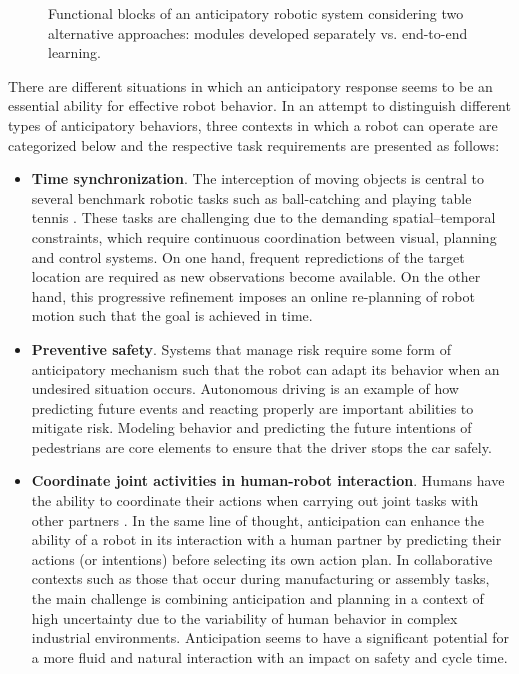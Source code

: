 \documentclass[conference]{IEEEtran}
\begin{document}
\begin{figure}[bp]
    \centering
    
    \caption{Functional blocks of an anticipatory robotic system considering two alternative approaches: modules developed separately vs. end-to-end learning.}
    \label{fig:anticipatorysystem}
\end{figure}

There are different situations in which an anticipatory response seems to be an essential ability for effective robot behavior. In an attempt to distinguish different types of anticipatory behaviors, three contexts in which a robot can operate are categorized below and the respective task requirements are presented as follows:

\begin{itemize}

\item \textbf{Time synchronization}. The interception of moving objects is central to several benchmark robotic tasks such as ball-catching and playing table tennis \cite{Carneiro2021, Wang2017}. These tasks are challenging due to the demanding spatial–temporal constraints, which require continuous coordination between visual, planning and control systems. On one hand, frequent repredictions of the target location are required as new observations become available. On the other hand, this progressive refinement imposes an online re-planning of robot motion such that the goal is achieved in time.

\item \textbf{Preventive safety}. Systems that manage risk require some form of anticipatory mechanism such that the robot can adapt its behavior when an undesired situation occurs. Autonomous driving is an example of how predicting future events and reacting properly are important abilities to mitigate risk. Modeling behavior and predicting the future intentions of pedestrians are core elements to ensure that the driver stops the car safely. %

\item \textbf{Coordinate joint activities in human-robot interaction}. Humans have the ability to coordinate their actions when carrying out joint tasks with other partners \cite{Sebanz2006,Hoffman2007}. In the same line of thought, anticipation can enhance the ability of a robot in its interaction with a human partner by predicting their actions (or intentions) before selecting its own action plan. In collaborative contexts such as those that occur during manufacturing or assembly tasks, the main challenge is combining anticipation and planning in a context of high uncertainty due to the variability of human behavior in complex industrial environments. Anticipation seems to have a significant potential for a more fluid and natural interaction with an impact on safety and cycle time.
\end{itemize}
\end{document}
